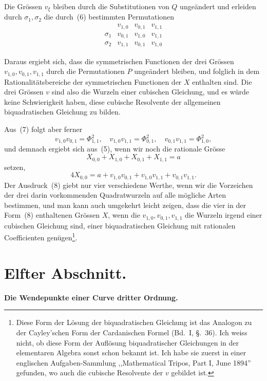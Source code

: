 \documentclass[12pt,a4paper]{article}
\begin{document}
Die Gr\"ossen $v_{\xi}$ bleiben durch die Substitutionen von $Q$ unge\"andert und erleiden durch $\sigma_1,\sigma_2$ die durch~(6) bestimmten Permutationen
\[
\begin{array}{c|ccc}
& v_{1,0} & v_{0,1} & v_{1,1}\\\hline
\sigma_1 & v_{0,1} & v_{1,0} & v_{1,1}\\
\sigma_2 & v_{1,1} & v_{0,1} & v_{1,0}
\end{array}
\]

Daraus ergiebt sich, dass die symmetrischen Functionen der drei Gr\"ossen $v_{1,0},v_{0,1},v_{1,1}$ durch die Permutationen $P$ unge\"andert bleiben, und folglich in dem Rationalit\"atsbereiche der symmetrischen Functionen der $X$ enthalten sind. Die drei Gr\"ossen $v$ sind also die Wurzeln einer cubischen Gleichung, und es w\"urde keine Schwierigkeit haben, diese cubische Resolvente der allgemeinen biquadratischen Gleichung zu bilden.

Aus~(7) folgt aber ferner
\[
v_{1,0}v_{0,1} = \Phi_{1,1}^2,\quad v_{1,0}v_{1,1} = \Phi_{0,1}^2,\quad v_{0,1}v_{1,1} = \Phi_{1,0}^2,
\]
und demnach ergiebt sich aus~(5), wenn wir noch die rationale Gr\"osse
\[
X_{0,0} + X_{1,0} + X_{0,1} + X_{1,1} = a
\]
setzen,
\begin{equation}
\tag{8}
4X_{0,0} = a + v_{1,0}v_{0,1} + v_{1,0}v_{1,1} + v_{0,1}v_{1,1}.
\end{equation}
Der Ausdruck~(8) giebt nur vier verschiedene Werthe, wenn wir die Vorzeichen der drei darin vorkommenden Quadratwurzeln auf alle m\"ogliche Arten bestimmen, und man kann auch umgekehrt leicht zeigen, dass die vier in der Form~(8) enthaltenen Gr\"ossen $X$, wenn die $v_{1,0},v_{0,1},v_{1,1}$ die Wurzeln irgend einer cubischen Gleichung sind, einer biquadratischen Gleichung mit rationalen Coefficienten gen\"ugen\footnote{Diese Form der L\"osung der biquadratischen Gleichung ist das Analogon zu der Cayley'schen Form der Cardanischen Formel (Bd.~I, \S.~36). Ich weiss nicht, ob diese Form der Aufl\"osung biquadratischer Gleichungen in der elementaren Algebra sonst schon bekannt ist. Ich habe sie zuerst in einer englischen Aufgaben-Sammlung ,,Mathematical Tripos, Part I, June 1894'' gefunden, wo auch die cubische Resolvente der $v$ gebildet ist.}.

\newpage
\section*{Elfter Abschnitt.}
\textbf{Die Wendepunkte einer Curve dritter Ordnung.}
\end{document}
